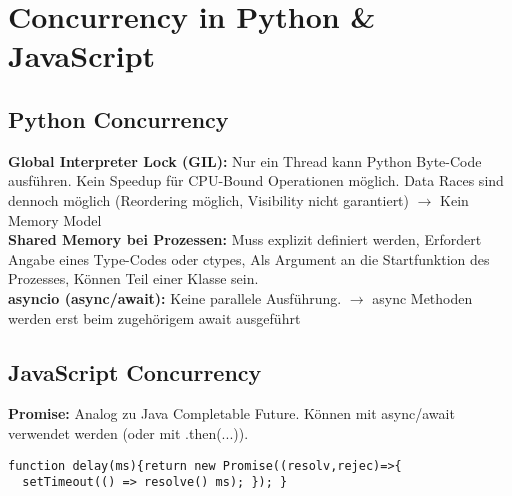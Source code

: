 
\section{Concurrency in Python \& JavaScript}
\subsection{Python Concurrency}
\textcolor{b}{\textbf{Global Interpreter Lock (GIL):}} Nur ein Thread kann Python Byte-Code ausführen. Kein Speedup für CPU-Bound Operationen möglich. Data Races sind dennoch möglich (Reordering möglich, Visibility nicht garantiert) $\rightarrow$ Kein Memory Model\\
\textcolor{b}{\textbf{Shared Memory bei Prozessen:}} Muss explizit definiert werden, Erfordert Angabe eines Type-Codes oder ctypes, Als Argument an die Startfunktion des Prozesses, Können Teil einer Klasse sein.\\
\textcolor{b}{\textbf{asyncio (async/await):}} Keine parallele Ausführung. $\rightarrow$ async Methoden werden erst beim zugehörigem await ausgeführt
\subsection{JavaScript Concurrency}
\textcolor{b}{\textbf{Promise:}} Analog zu Java Completable Future. Können mit async/await verwendet werden (oder mit .then(...)).
\begin{lstlisting}
function delay(ms){return new Promise((resolv,rejec)=>{
  setTimeout(() => resolve() ms); }); }
\end{lstlisting}